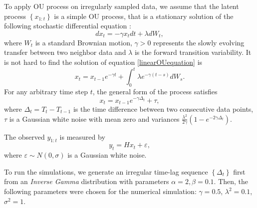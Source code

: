 To apply OU process on irregularly sampled data, we assume that the latent process $\left\lbrace x_{1:t}\right\rbrace$ is a simple OU process, that is a stationary solution of the following stochastic differential equation : 
\begin{equation}\label{linearOUequation}
dx_t= -\gamma x_tdt+\lambda dW_t, 
\end{equation}
where $W_t$ is a standard Brownian motion, $\gamma>0$ represents the slowly evolving transfer between two neighbor data and $\lambda$ is the forward transition variability. It is not hard to find the solution of equation \eqref{linearOUequation} is 
\begin{equation}
x_t = x_{t-1}e^{-\gamma t} +\int_{0}^{t} \lambda e^{-\gamma (t-s)}dW_s. 
\end{equation}
For any arbitrary time step $t$, the general form of the process satisfies 
\begin{equation}
x_t = x_{t-1}e^{-\gamma \Delta_t} + \tau,
\end{equation}
where $\Delta_t = T_t-T_{t-1}$ is the time difference between two consecutive data points, $\tau$ is a Gaussian white noise with mean zero and variances $\frac{\lambda^2}{2\gamma}\left(1-e^{-2\gamma\Delta_t}\right)$. 

The observed $y_{1:t}$ is measured by 
\begin{equation}
y_t = Hx_t + \varepsilon,
\end{equation}
where $\varepsilon\sim N(0,\sigma)$ is a Gaussian white noise. 

To run the simulations, we generate an irregular time-lag sequence $\left\lbrace \Delta_t\right\rbrace$ first from an \textit{Inverse Gamma} distribution with parameters $\alpha=2, \beta=0.1$. Then, the following parameters were chosen for the numerical simulation: $\gamma = 0.5$, $\lambda^2 = 0.1$, $\sigma^2=1$. 



